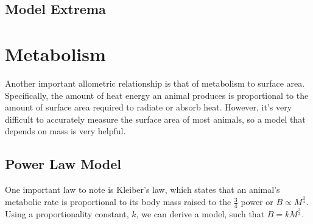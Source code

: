 \documentclass[10pt,letterpaper]{article}
\begin{document}
		\subsection{Model Extrema}
	\section{Metabolism}
		Another important allometric relationship is that of metabolism to surface area. Specifically, the amount of heat energy an animal produces is proportional to the amount of surface area required to radiate or absorb heat. However, it's very difficult to accurately measure the surface area of most animals, so a model that depends on mass is very helpful. 
		\subsection{Power Law Model}
			One important law to note is Kleiber's law, which states that an animal's metabolic rate is proportional to its body mass raised to the $\frac 3 4$ power or $B \propto M^{\frac 3 4}$. Using a proportionality constant, $k$, we can derive a model, such that $B = kM^{\frac 3 4}$.
\end{document}
